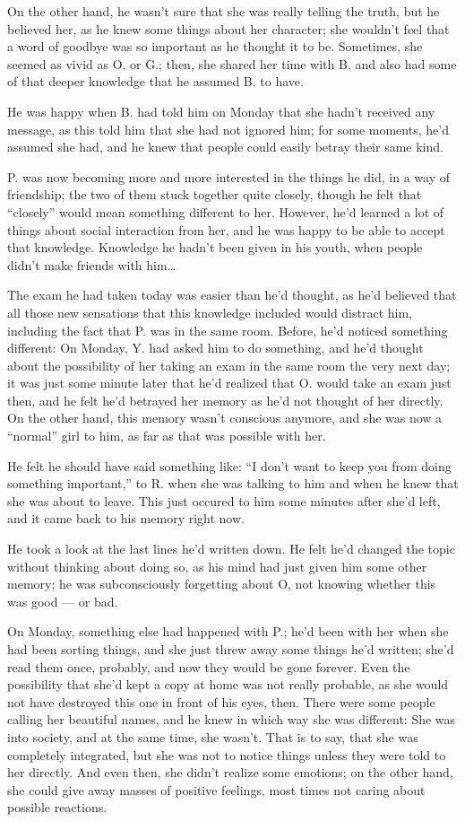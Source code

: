 On the other hand, he wasn't sure that she was really telling the truth, but he believed her, as he knew some things about her character; she wouldn't feel that a word of goodbye was so important as he thought it to be. Sometimes, she seemed as vivid as O. or G.; then, she shared her time with B. and also had some of that deeper knowledge that he assumed B. to have.

He was happy when B. had told him on Monday that she hadn't received any message, as this told him that she had not ignored him; for some moments, he'd assumed she had, and he knew that people could easily betray their same kind.

P. was now becoming more and more interested in the things he did, in a way of friendship; the two of them stuck together quite closely, though he felt that \enquote{closely} would mean something different to her. However, he'd learned a lot of things about social interaction from her, and he was happy to be able to accept that knowledge. Knowledge he hadn't been given in his youth, when people didn't make friends with him\ldots

The exam he had taken today was easier than he'd thought, as he'd believed that all those new sensations that this knowledge included would distract him, including the fact that P. was in the same room. Before, he'd noticed something different: On Monday, Y. had asked him to do something, and he'd thought about the possibility of her taking an exam in the same room the very next day; it was just some minute later that he'd realized that O. would take an exam just then, and he felt he'd betrayed her memory as he'd not thought of her directly. On the other hand, this memory wasn't conscious anymore, and she was now a \enquote{normal} girl to him, as far as that was possible with her.

He felt he should have said something like: \enquote{I don't want to keep you from doing something important,} to R. when she was talking to him and when he knew that she was about to leave. This just occured to him some minutes after she'd left, and it came back to his memory right now.

He took a look at the last lines he'd written down. He felt he'd changed the topic without thinking about doing so, as his mind had just given him some other memory; he was subconsciously forgetting about O, not knowing whether this was good --- or bad.

On Monday, something else had happened with P.; he'd been with her when she had been sorting things, and she just threw away some things he'd written; she'd read them once, probably, and now they would be gone forever. Even the possibility that she'd kept a copy at home was not really probable, as she would not have destroyed this one in front of his eyes, then. There were some people calling her beautiful names, and he knew in which way she was different: She was into society, and at the same time, she wasn't. That is to say, that she was completely integrated, but she was not to notice things unless they were told to her directly. And even then, she didn't realize some emotions; on the other hand, she could give away masses of positive feelings, most times not caring about possible reactions.

